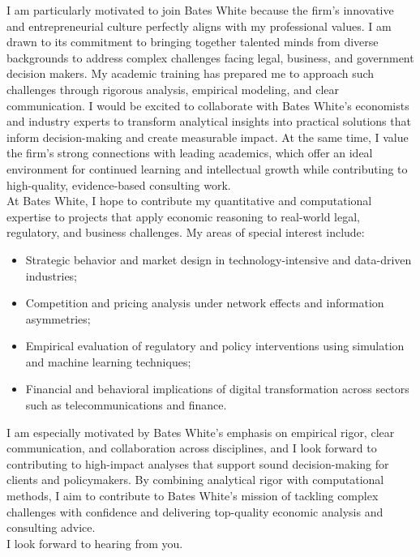 \documentclass{nfr}
\begin{document}
I am particularly motivated to join Bates White because the firm’s innovative and entrepreneurial culture perfectly aligns with my professional values. I am drawn to its commitment to bringing together talented minds from diverse backgrounds to address complex challenges facing legal, business, and government decision makers. My academic training has prepared me to approach such challenges through rigorous analysis, empirical modeling, and clear communication. I would be excited to collaborate with Bates White’s economists and industry experts to transform analytical insights into practical solutions that inform decision-making and create measurable impact. At the same time, I value the firm’s strong connections with leading academics, which offer an ideal environment for continued learning and intellectual growth while contributing to high-quality, evidence-based consulting work.\\

At Bates White, I hope to contribute my quantitative and computational expertise to projects that apply economic reasoning to real-world legal, regulatory, and business challenges. 
My areas of special interest include:
\begin{itemize}
    \item Strategic behavior and market design in technology-intensive and data-driven industries;
    \item Competition and pricing analysis under network effects and information asymmetries;
    \item Empirical evaluation of regulatory and policy interventions using simulation and machine learning techniques;
    \item Financial and behavioral implications of digital transformation across sectors such as telecommunications and finance.
\end{itemize}
I am especially motivated by Bates White’s emphasis on empirical rigor, clear communication, and collaboration across disciplines, and I look forward to contributing to high-impact analyses that support sound decision-making for clients and policymakers.
By combining analytical rigor with computational methods, I aim to contribute to Bates White’s mission of tackling complex challenges with confidence and delivering top-quality economic analysis and consulting advice.\\

I look forward to hearing from you.\\
\vspace{10mm}
\end{document}

